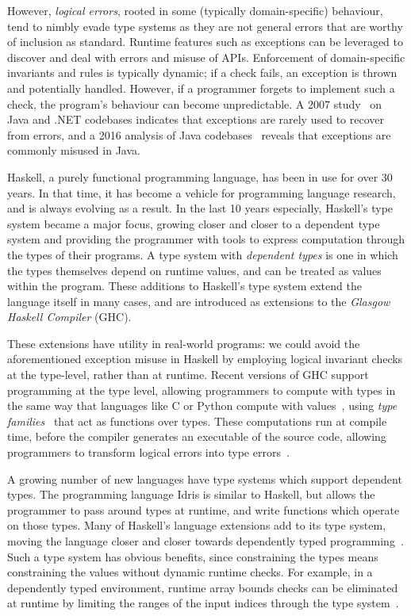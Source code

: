However, \emph{logical errors}, rooted in some (typically domain-specific) behaviour, tend to nimbly evade type systems as they are not general errors that are worthy of inclusion as standard. Runtime features such as exceptions can be leveraged to discover and deal with errors and misuse of APIs. Enforcement of domain-specific invariants and rules is typically dynamic; if a check fails, an exception is thrown and potentially handled. However, if a programmer forgets to implement such a check, the program's behaviour can become unpredictable. A 2007 study~\cite{exceptionsusedpoorly} on Java and .NET codebases indicates that exceptions are rarely used to recover from errors, and a 2016 analysis of Java codebases~\cite{badjavaexceptions} reveals that exceptions are commonly misused in Java.

Haskell, a purely functional programming language, has been in use for over 30 years. In that time, it has become a vehicle for programming language research, and is always evolving as a result. In the last 10 years especially, Haskell's type system became a major focus, growing closer and closer to a dependent type system and providing the programmer with tools to express computation through the types of their programs. A type system with \emph{dependent types} is one in which the types themselves depend on runtime values, and can be treated as values within the program. These additions to Haskell's type system extend the language itself in many cases, and are introduced as extensions to the \emph{Glasgow Haskell Compiler} (GHC).

These extensions have utility in real-world programs: we could avoid the aforementioned exception misuse in Haskell by employing logical invariant checks at the type-level, rather than at runtime. Recent versions of GHC support programming at the type level, allowing programmers to compute with types in the same way that languages like C or Python compute with values~\cite{givingpromotion}, using \emph{type families}~\cite{opentfs,closedtfs} that act as functions over types. These computations run at compile time, before the compiler generates an executable of the source code, allowing programmers to transform logical errors into type errors~\cite{twt}.

A growing number of new languages have type systems which support dependent types. The programming language Idris is similar to Haskell, but allows the programmer to pass around types at runtime, and write functions which operate on those types. Many of Haskell's language extensions add to its type system, moving the language closer and closer towards dependently typed programming~\cite{singletons}. Such a type system has obvious benefits, since constraining the types means constraining the values without dynamic runtime checks. For example, in a dependently typed environment, runtime array bounds checks can be eliminated at runtime by limiting the ranges of the input indices through the type system~\cite{dependentarray}.

